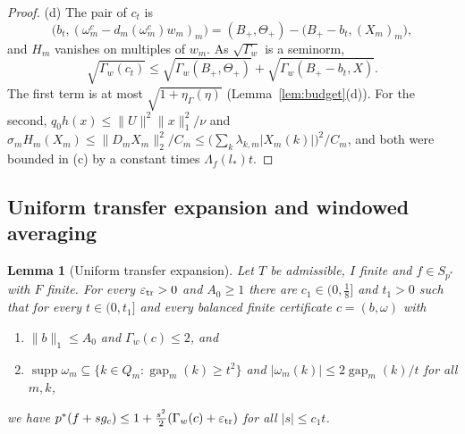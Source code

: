 \documentclass[10pt]{amsart}
\newtheorem{lemma}[theorem]{Lemma}
\theoremstyle{definition}
\theoremstyle{remark}
\newcommand{\supp}{\operatorname{supp}}
\newcommand{\gap}{\operatorname{gap}}
\begin{document}
\begin{proof}
(d) The pair of $c_t$ is
\[
 \big(b_t,(\omega^c_m-d_m(\omega^c_m)w_m)_m\big)=(B_+,\Theta_+)-\big(B_+-b_t,
 (X_m)_m\big),
\]
and $H_m$ vanishes on multiples of $w_m$.  As $\sqrt{\Gamma_w}$ is a
seminorm,
\[
 \sqrt{\Gamma_w(c_t)}\le\sqrt{\Gamma_w(B_+,\Theta_+)}+\sqrt{\Gamma_w(B_+-
 b_t,X)}.
\]  The first term is at most
$\sqrt{1+\eta_\Gamma(\eta)}$ (Lemma~\ref{lem:budget}(d)).  For the second,
$q_0h(x)\le\|U\|^2\|x\|_1^2/\nu$ and
$\sigma_mH_m(X_m)\le\|D_mX_m\|_2^2/C_m\le\big(\sum_k\lambda_{k,m}|X_m(k)|
\big)^2/C_m$, and both were bounded in (c) by a
constant times $\Lambda_f(l_*)t$.
\end{proof}

\subsection{Uniform transfer expansion and windowed averaging}

\begin{lemma}[Uniform transfer expansion]\label{lem:uniformtransfer}
Let $T$ be admissible, $I$ finite and $f\in S_{p^*}$ with $F$ finite.  For
every $\varepsilon_{\rm tr}>0$ and $A_0\ge1$ there are $c_1\in(0,\frac18]$ and
$t_1>0$ such that for every $t\in(0,t_1]$ and every balanced finite
certificate $c=(b,\omega)$ with
\begin{enumerate}
\item[(C-a)] $\|b\|_1\le A_0$ and $\Gamma_w(c)\le2$, and
\item[(C-b)] $\supp\omega_m\subseteq\{k\in Q_m:\gap_m(k)\ge t^2\}$ and
$|\omega_m(k)|\le2\gap_m(k)/t$ for all $m,k$,
\end{enumerate}
we have $p^*(f+sg_c)\le1+\frac{s^2}2(\Gamma_w(c)+\varepsilon_{\rm tr})$ for
all $|s|\le c_1t$.
\end{lemma}
\end{document}
